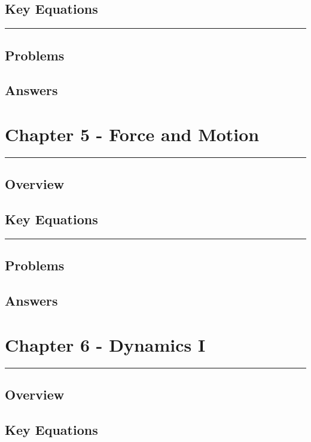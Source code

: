\documentclass[a4paper,12pt]{article}
\begin{document}
\subsection*{Key Equations}

\begin{center}
  \rule{6cm}{0.5pt}
\end{center}
\subsection*{Problems}
\subsection*{Answers}

\pagebreak
\section*{Chapter 5 - Force and Motion}
\rule{\linewidth}{1pt}
\subsection*{Overview}
\subsection*{Key Equations}

\begin{center}
  \rule{6cm}{0.5pt}
\end{center}
\subsection*{Problems}
\subsection*{Answers}

\pagebreak
\section*{Chapter 6 - Dynamics I}
\rule{\linewidth}{1pt}
\subsection*{Overview}
\subsection*{Key Equations}
\end{document}
